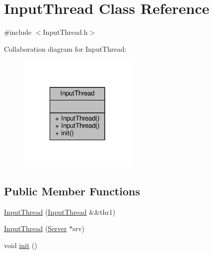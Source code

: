 \hypertarget{class_input_thread}{\section{Input\-Thread Class Reference}
\label{class_input_thread}
}


{\ttfamily \#include $<$Input\-Thread.\-h$>$}



Collaboration diagram for Input\-Thread\-:
\nopagebreak
\begin{figure}[H]
\begin{center}
\leavevmode
\includegraphics[width=162pt]{class_input_thread__coll__graph}
\end{center}
\end{figure}
\subsection*{Public Member Functions}
\begin{DoxyCompactItemize}
\item 
\hyperlink{class_input_thread_a79ba754c063684c11485a951fac84e8b}{Input\-Thread} (\hyperlink{class_input_thread}{Input\-Thread} \&\&thr1)
\item 
\hyperlink{class_input_thread_a486139cd9105ce017bcf930dc3e0747b}{Input\-Thread} (\hyperlink{class_server}{Server} $\ast$srv)
\item 
void \hyperlink{class_input_thread_ac33f0f934c6dc40c7747b96e8b60a736}{init} ()
\end{DoxyCompactItemize}


